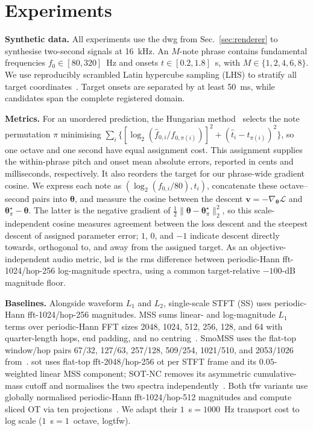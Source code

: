 \documentclass[letterpaper]{article}
\begin{document}
\section{Experiments}
\label{sec:experiments}

\textbf{Synthetic data.}
All experiments use the \Gls{dwg} from Sec.~\ref{sec:renderer} to synthesise two-second signals at 16~kHz. An $M$-note phrase contains fundamental frequencies $f_0\in[80,320]$~Hz and onsets $t\in[0.2,1.8]$~s, with $M\in\{1,2,4,6,8\}$. We use reproducibly scrambled Latin hypercube sampling (LHS) to stratify all target coordinates~\cite{mckay1979comparison}. Target onsets are separated by at least 50~ms, while candidates span the complete registered domain.

\textbf{Metrics.}
For an unordered prediction, the Hungarian method~\cite{kuhn1955hungarian} selects the note permutation $\pi$ minimising $\sum_i\{[\log_2(\hat f_{0,i}/f_{0,\pi(i)})]^2+ (\hat t_i-t_{\pi(i)})^2\}$, so one octave and one second have equal assignment cost. This assignment supplies the within-phrase pitch and onset mean absolute errors, reported in cents and milliseconds, respectively. It also reorders the target for our phrase-wide gradient cosine. We express each note as $(\log_2(f_{0,i}/80),t_i)$, concatenate these octave--second pairs into $\boldsymbol\theta$, and measure the cosine between the descent $\boldsymbol v=-\nabla_{\boldsymbol\theta}\mathcal L$ and $\boldsymbol\theta^\star_\pi-\boldsymbol\theta$. The latter is the negative gradient of $\tfrac12\lVert\boldsymbol\theta- \boldsymbol\theta^\star_\pi\rVert_2^2$, so this scale-independent cosine measures agreement between the loss descent and the steepest descent of assigned parameter error; $1$, $0$, and $-1$ indicate descent directly towards, orthogonal to, and away from the assigned target. As an objective-independent audio metric, \gls{lsd} is the \gls{rms} difference between periodic-Hann \acrshort{fft}-1024/hop-256 log-magnitude spectra, using a common target-relative $-100$-dB magnitude floor.

\textbf{Baselines.}
Alongside waveform $L_1$ and $L_2$, single-scale STFT (SS) uses periodic-Hann
\acrshort{fft}-1024/hop-256 magnitudes. MSS sums linear- and log-magnitude
$L_1$ terms over periodic-Hann FFT sizes 2048, 1024, 512, 256, 128, and 64
with quarter-length hops, end padding, and no centring~\cite{wang2019nsf,engel2020ddsp}.
SmoMSS uses the flat-top window/hop pairs 67/32, 127/63, 257/128, 509/254,
1021/510, and 2053/1026 from~\cite{schwar2023mss}. \Gls{sot} uses flat-top
\acrshort{fft}-2048/hop-256 \gls{ot} per STFT frame and its $0.05$-weighted linear MSS
component; SOT-NC removes its asymmetric cumulative-mass cutoff and normalises
the two spectra independently~\cite{torres2024sot}. Both \gls{tfw} variants use
globally normalised periodic-Hann \acrshort{fft}-1024/hop-512 magnitudes and compute sliced OT via ten projections~\cite{fabiani2024jtfot}. We adapt their $1$~s${}=1000$~Hz transport cost to log scale ($1$~s${}=1$~octave, log\gls{tfw}).
\end{document}
